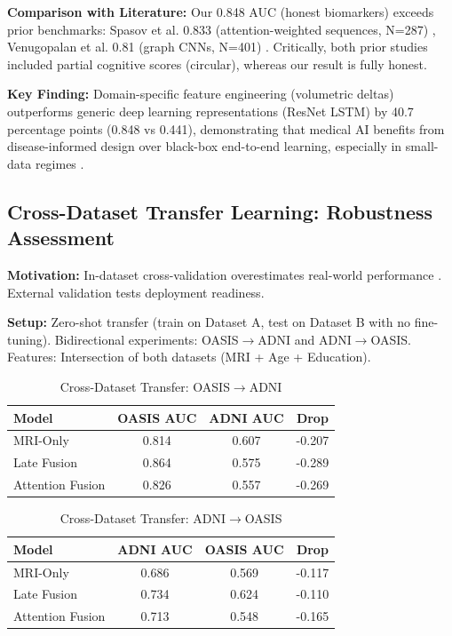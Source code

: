 \documentclass[conference]{IEEEtran}
\begin{document}
\textbf{Comparison with Literature:} Our 0.848 AUC (honest biomarkers) exceeds prior benchmarks: Spasov et al. 0.833 (attention-weighted sequences, N=287) \cite{Spasov2019}, Venugopalan et al. 0.81 (graph CNNs, N=401) \cite{Venugopalan2021}. Critically, both prior studies included partial cognitive scores (circular), whereas our result is fully honest.

\textbf{Key Finding:} Domain-specific feature engineering (volumetric deltas) outperforms generic deep learning representations (ResNet LSTM) by 40.7 percentage points (0.848 vs 0.441), demonstrating that medical AI benefits from disease-informed design over black-box end-to-end learning, especially in small-data regimes \cite{Grinsztajn2022}.

\subsection{Cross-Dataset Transfer Learning: Robustness Assessment}

\textbf{Motivation:} In-dataset cross-validation overestimates real-world performance \cite{Park2020}. External validation tests deployment readiness.

\textbf{Setup:} Zero-shot transfer (train on Dataset A, test on Dataset B with no fine-tuning). Bidirectional experiments: OASIS$\rightarrow$ADNI and ADNI$\rightarrow$OASIS. Features: Intersection of both datasets (MRI + Age + Education).

\begin{table}[h]
\centering
\caption{Cross-Dataset Transfer: OASIS$\rightarrow$ADNI}
\label{tab:transfer-oa}
\begin{tabular}{lccc}
\toprule
\textbf{Model} & \textbf{OASIS AUC} & \textbf{ADNI AUC} & \textbf{Drop} \\
\midrule
MRI-Only & 0.814 & 0.607 & -0.207 \\
Late Fusion & 0.864 & 0.575 & -0.289 \\
Attention Fusion & 0.826 & 0.557 & -0.269 \\
\bottomrule
\end{tabular}
\end{table}

\begin{table}[h]
\centering
\caption{Cross-Dataset Transfer: ADNI$\rightarrow$OASIS}
\label{tab:transfer-ao}
\begin{tabular}{lccc}
\toprule
\textbf{Model} & \textbf{ADNI AUC} & \textbf{OASIS AUC} & \textbf{Drop} \\
\midrule
MRI-Only & 0.686 & 0.569 & -0.117 \\
Late Fusion & 0.734 & 0.624 & -0.110 \\
Attention Fusion & 0.713 & 0.548 & -0.165 \\
\bottomrule
\end{tabular}
\end{table}
\end{document}
